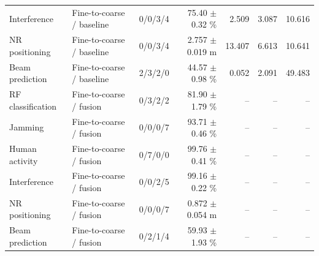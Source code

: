 \begin{table}[t]
\begin{tabular}{lllrrrr}
Interference & Fine-to-coarse / baseline & 0/0/3/4 & 75.40 $\pm$ 0.32 \% & 2.509 & 3.087 & 10.616 \\
NR positioning & Fine-to-coarse / baseline & 0/0/3/4 & 2.757 $\pm$ 0.019 m & 13.407 & 6.613 & 10.641 \\
Beam prediction & Fine-to-coarse / baseline & 2/3/2/0 & 44.57 $\pm$ 0.98 \% & 0.052 & 2.091 & 49.483 \\
RF classification & Fine-to-coarse / fusion & 0/3/2/2 & 81.90 $\pm$ 1.79 \% & -- & -- & -- \\
Jamming & Fine-to-coarse / fusion & 0/0/0/7 & 93.71 $\pm$ 0.46 \% & -- & -- & -- \\
Human activity & Fine-to-coarse / fusion & 0/7/0/0 & 99.76 $\pm$ 0.41 \% & -- & -- & -- \\
Interference & Fine-to-coarse / fusion & 0/0/2/5 & 99.16 $\pm$ 0.22 \% & -- & -- & -- \\
NR positioning & Fine-to-coarse / fusion & 0/0/0/7 & 0.872 $\pm$ 0.054 m & -- & -- & -- \\
Beam prediction & Fine-to-coarse / fusion & 0/2/1/4 & 59.93 $\pm$ 1.93 \% & -- & -- & -- \\
\hline
\end{tabular}
\end{table}
